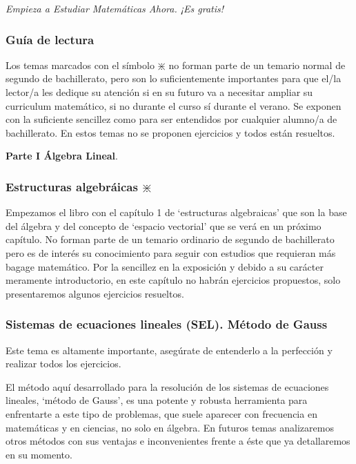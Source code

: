 \emph{Empieza a Estudiar Matemáticas Ahora. ¡Es gratis!}

\subsubsection{Guía de lectura}

Los temas marcados con el símbolo  $\divideontimes$ no forman parte de un temario normal de segundo de bachillerato, pero son lo suficientemente importantes para que el/la lector/a les dedique su atención si en su futuro va a  necesitar ampliar su curriculum matemático, si no durante el curso sí durante el verano. Se exponen con la suficiente sencillez como para ser entendidos por cualquier alumno/a de bachillerato. En estos temas no se proponen ejercicios y todos están resueltos. 

\vspace{5mm}
\Large {\textbf{Parte I Álgebra Lineal}}\normalsize{.}

\subsubsection{Estructuras algebráicas  $\divideontimes$}

Empezamos el libro con el capítulo 1 de `estructuras algebraicas' que son la base del álgebra y del concepto de `espacio vectorial' que se verá en un próximo capítulo. No forman parte de un temario ordinario de segundo de bachillerato pero es de interés su conocimiento para seguir con estudios que requieran más bagage matemático. Por la sencillez en la exposición y debido a su carácter meramente introductorio, en este capítulo no habrán ejercicios propuestos, solo presentaremos algunos ejercicios resueltos.

\subsubsection{Sistemas de ecuaciones lineales (SEL). Método de Gauss}

Este tema es altamente importante, asegúrate de entenderlo a la perfección y realizar todos los ejercicios. 

El método aquí desarrollado para la resolución de los sistemas de ecuaciones lineales, `método de Gauss', es una potente y robusta herramienta para enfrentarte a este tipo de problemas, que suele aparecer con frecuencia en matemáticas y en ciencias, no solo en álgebra. En futuros temas analizaremos otros métodos con sus ventajas e inconvenientes frente a éste que ya detallaremos en su momento.

